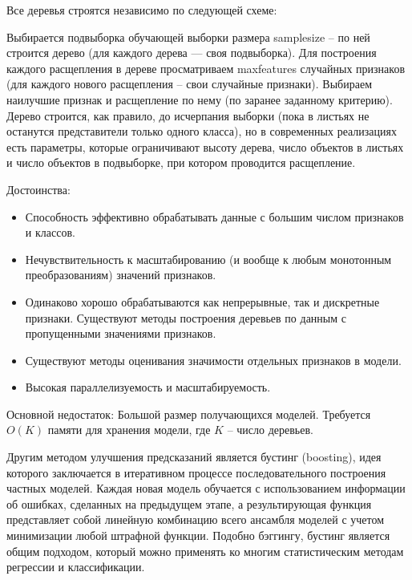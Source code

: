 \documentclass[a4paper, 12pt]{article}
\begin{document}
	Все деревья строятся независимо по следующей схеме:
	
	Выбирается подвыборка обучающей выборки размера samplesize -- по ней строится дерево (для каждого дерева — своя подвыборка).
	Для построения каждого расщепления в дереве просматриваем maxfeatures случайных признаков (для каждого нового расщепления -- свои случайные признаки).
	Выбираем наилучшие признак и расщепление по нему (по заранее заданному критерию). Дерево строится, как правило, до исчерпания выборки (пока в листьях не останутся представители только одного класса), но в современных реализациях есть параметры, которые ограничивают высоту дерева, число объектов в листьях и число объектов в подвыборке, при котором проводится расщепление.
	
	Достоинства:
	\begin{itemize}
		\item Способность эффективно обрабатывать данные с большим числом признаков и классов.
		\item Нечувствительность к масштабированию (и вообще к любым монотонным преобразованиям) значений признаков.
		\item Одинаково хорошо обрабатываются как непрерывные, так и дискретные признаки. Существуют методы построения деревьев по данным с пропущенными значениями признаков.
		\item Существуют методы оценивания значимости отдельных признаков в модели.
		\item Высокая параллелизуемость и масштабируемость.
	\end{itemize}
	Основной недостаток: Большой размер получающихся моделей. Требуется $O(K)$ памяти для хранения модели, где $K$ -- число деревьев.

	Другим методом улучшения предсказаний является бустинг (boosting), идея которого заключается в итеративном процессе последовательного построения частных моделей. Каждая новая модель обучается с использованием информации об ошибках, сделанных на предыдущем этапе, а результирующая функция представляет собой линейную комбинацию всего ансамбля моделей с учетом минимизации любой штрафной функции. Подобно бэггингу, бустинг является общим подходом, который можно применять ко многим статистическим методам регрессии и классификации.
\end{document}
